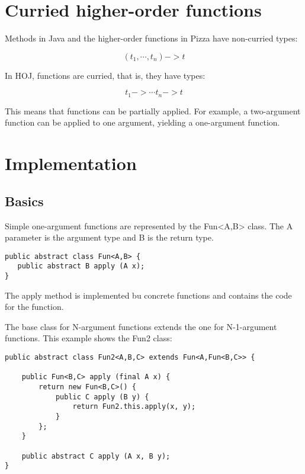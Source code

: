 \documentclass{article}
\begin{document}
\section{Curried higher-order functions}

Methods in Java and the higher-order functions in Pizza have non-curried
types:

\begin{displaymath}
(t_1, \cdots, t_n) -> t
\end{displaymath}

In HOJ, functions are curried, that is, they have types:

\begin{displaymath}
t_1 -> \cdots t_n -> t
\end{displaymath}

This means that functions can be partially applied. For example, a two-argument
function can be applied to one argument, yielding a one-argument function.


\section{Implementation}

\subsection{Basics}

Simple one-argument functions are represented by the Fun<A,B> class.
The A parameter is the argument type and B is the return type.

\begin{Verbatim}
public abstract class Fun<A,B> {
   public abstract B apply (A x);
}
\end{Verbatim}

The apply method is implemented bu concrete functions and contains
the code for the function.

The base class for N-argument functions extends the one for
N-1-argument functions. This example shows the Fun2 class:

\begin{Verbatim}
public abstract class Fun2<A,B,C> extends Fun<A,Fun<B,C>> {

	public Fun<B,C> apply (final A x) {
		return new Fun<B,C>() {
			public C apply (B y) {
				return Fun2.this.apply(x, y);
			}
		};
	}

	public abstract C apply (A x, B y);
}
\end{Verbatim}
\end{document}
